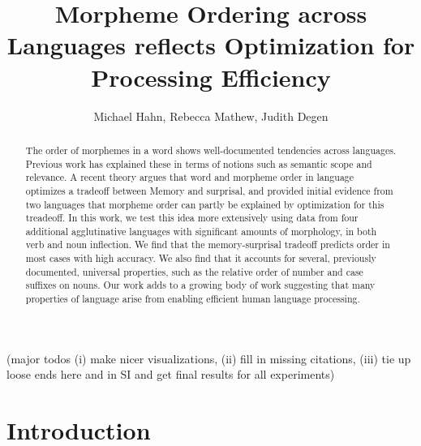 \documentclass[11pt,letterpaper]{article}
\title{Morpheme Ordering across Languages reflects Optimization for Processing Efficiency}
\author{Michael Hahn, Rebecca Mathew, Judith Degen}
\newcommand\mhahn[1]{{\color{red}(#1)}}
\begin{document}
\maketitle

\begin{abstract}
    The order of morphemes in a word shows well-documented tendencies across languages.
Previous work has explained these in terms of notions such as semantic scope and relevance.
A recent theory argues that word and morpheme order in language optimizes a tradeoff between Memory and surprisal, and provided initial evidence from two languages that morpheme order can partly be explained by optimization for this treadeoff.
In this work, we test this idea more extensively using data from four additional agglutinative languages with significant amounts of morphology, in both verb and noun inflection.
We find that the memory-surprisal tradeoff predicts order in most cases with high accuracy.
We also find that it accounts for several, previously documented, universal properties, such as the relative order of number and case suffixes on nouns.
Our work adds to a growing body of work suggesting that many properties of language arise from enabling efficient human language processing.
\end{abstract}




\mhahn{major todos (i) make nicer visualizations, (ii) fill in missing citations, (iii) tie up loose ends here and in SI and get final results for all experiments}

\section{Introduction}
\end{document}
